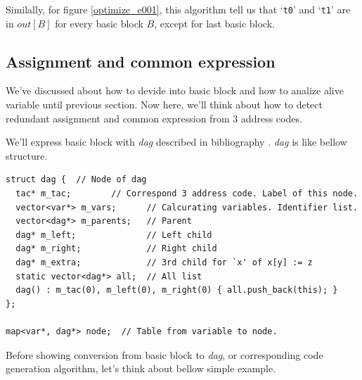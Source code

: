 \vspace{0.5cm}

Similally, for figure \ref{optimize_e001},
this algorithm tell us that
`{\tt{t0}}' and `{\tt{t1}}'
are in $out[B]$ for every basic block $B$, except for last basic block.

\subsection{Assignment and common expression}
\label{optimize_e_assign}
We've discussed about how to devide into basic block
and how to analize alive variable until previous section. Now here, 
we'll think about how to detect redundant assignment and common
expression from 3 address codes.

We'll express basic block with {\em dag} described in bibliography
 \cite{doragon}. {\em dag} is like bellow structure.

\begin{verbatim}
struct dag {  // Node of dag
  tac* m_tac;        // Correspond 3 address code. Label of this node.
  vector<var*> m_vars;      // Calcurating variables. Identifier list.
  vector<dag*> m_parents;   // Parent
  dag* m_left;              // Left child
  dag* m_right;             // Right child
  dag* m_extra;             // 3rd child for `x' of x[y] := z
  static vector<dag*> all;  // All list
  dag() : m_tac(0), m_left(0), m_right(0) { all.push_back(this); }
};

map<var*, dag*> node;  // Table from variable to node.
\end{verbatim}

Before showing conversion from basic block to {\em dag},
or corresponding code generation algorithm,
let's think about bellow simple example.

